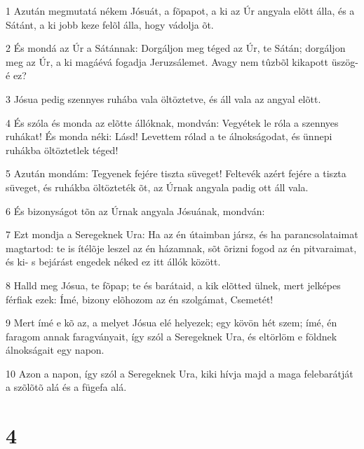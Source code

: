 \par 1 Azután megmutatá nékem Jósuát, a fõpapot, a ki az Úr angyala elõtt álla, és a Sátánt, a ki jobb keze felõl álla, hogy vádolja õt.
\par 2 És mondá az Úr a Sátánnak: Dorgáljon meg téged az Úr, te Sátán; dorgáljon meg az Úr, a ki magáévá fogadja Jeruzsálemet. Avagy nem tûzbõl kikapott üszög-é ez?
\par 3 Jósua pedig szennyes ruhába vala öltöztetve, és áll vala az angyal elõtt.
\par 4 És szóla és monda az elõtte állóknak, mondván: Vegyétek le róla a szennyes ruhákat! És monda néki: Lásd! Levettem rólad a te álnokságodat, és ünnepi ruhákba öltöztetlek téged!
\par 5 Azután mondám: Tegyenek fejére tiszta süveget! Feltevék azért fejére a tiszta süveget, és ruhákba öltözteték õt, az Úrnak angyala padig ott áll vala.
\par 6 És bizonyságot tõn az Úrnak angyala Jósuának, mondván:
\par 7 Ezt mondja a Seregeknek Ura: Ha az én útaimban jársz, és ha parancsolataimat magtartod: te is ítélõje leszel az én házamnak, sõt õrizni fogod az én pitvaraimat, és ki- s bejárást engedek néked ez itt állók között.
\par 8 Halld meg Jósua, te fõpap; te és barátaid, a kik elõtted ülnek, mert jelképes férfiak ezek: Ímé, bizony elõhozom az én szolgámat, Csemetét!
\par 9 Mert ímé e kõ az, a melyet Jósua elé helyezek; egy kövön hét szem; ímé, én faragom annak faragványait, így szól a Seregeknek Ura, és eltörlöm e földnek álnokságait egy napon.
\par 10 Azon a napon, így szól a Seregeknek Ura, kiki hívja majd a maga felebarátját a szõlõtõ alá és a fügefa alá.

\chapter{4}

